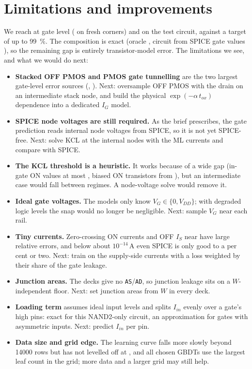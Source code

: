 \section{Limitations and improvements}\label{sec:limitations}

We reach \GateMeanAcc{} at gate level (\FreshMeanAcc{} on fresh corners) and \CircuitMeanAcc{} on
the test circuit, against a target of up to \qty{99}{\percent}. The composition is exact (oracle
\OracleMeanAcc, circuit from SPICE gate values \CompSpiceMeanAcc), so the remaining gap is entirely
transistor-model error. The limitations we see, and what we would do next:
\begin{itemize}
  \item \textbf{Stacked OFF PMOS and PMOS gate tunnelling} are the two largest gate-level error
        sources (\ErrorSourceFirst, \ErrorSourceSecond). Next: oversample OFF PMOS with the
        drain on an intermediate stack node, and build the physical $\exp(-\alpha\,t_{ox})$
        dependence into a dedicated $I_G$ model.
  \item \textbf{SPICE node voltages are still required.} As the brief prescribes, the gate
        prediction reads internal node voltages from SPICE, so it is not yet SPICE-free. Next:
        solve KCL at the internal nodes with the ML currents and compare with SPICE.
  \item \textbf{The \KclVdsMax{} KCL threshold is a heuristic.} It works because of a wide gap
        (in-gate ON values at most \OnVdsMax, biased ON transistors from \OnBiasedVdsMin), but an
        intermediate case would fall between regimes. A node-voltage solve would remove it.
  \item \textbf{Ideal gate voltages.} The models only know $V_G\in\{0,V_{DD}\}$; with degraded
        logic levels the snap would no longer be negligible. Next: sample $V_G$ near each rail.
  \item \textbf{Tiny currents.} Zero-crossing ON currents and OFF $I_S$ near \IFloor{} have large
        relative errors, and below about $10^{-14}$\,A even SPICE is only good to a per cent or
        two. Next: train on the supply-side currents with a loss weighted by their share of the
        gate leakage.
  \item \textbf{Junction areas.} The decks give no \texttt{AS}/\texttt{AD}, so junction leakage
        sits on a $W$-independent floor. Next: set junction areas from $W$ in every deck.
  \item \textbf{Loading term} assumes ideal input levels and splits $I_{in}$ evenly over a gate's
        high pins: exact for this NAND2-only circuit, an approximation for gates with asymmetric
        inputs. Next: predict $I_{in}$ per pin.
  \item \textbf{Data size and grid edge.} The learning curve falls more slowly beyond \num{14000} rows
        but has not levelled off at \LCMaxSize{}, and
        all chosen GBDTs use the largest leaf count in the grid; more data and a larger grid may
        still help.
\end{itemize}

